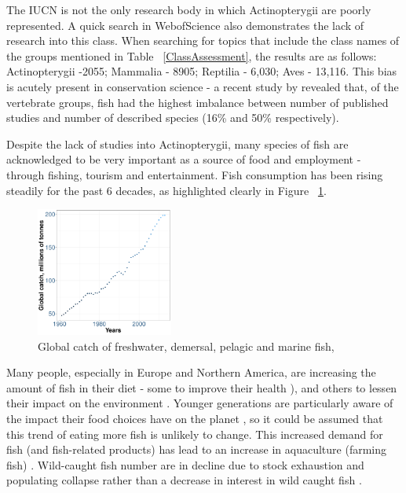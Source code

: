 \documentclass[11pt]{article}
\begin{document}
The IUCN is not the only research body in which Actinopterygii are poorly 
represented. A 
quick search in WebofScience also demonstrates the lack of research into this 
class. When searching for topics that include the class names of the groups 
mentioned in Table ~\ref{ClassAssessment}, the results are as follows: 
Actinopterygii -2055; Mammalia - 8905; Reptilia - 6,030; Aves - 13,116.  This 
bias is acutely present in conservation science - a recent study by 
\cite{Watson2017} revealed that, of the vertebrate groups, fish had the highest 
imbalance between number of published studies and number of described species 
(16\% and 50\% respectively).

Despite the lack of studies into Actinopterygii, many species of fish are 
acknowledged to be very important as a source of food and employment - through 
fishing, tourism and entertainment. Fish consumption 
has been rising steadily for the past 6 decades, as highlighted clearly in 
Figure ~\ref{GlobalCatch}. 

\begin{figure}
	
	\includegraphics[width=0.4\textwidth]{Images/GobalCatch.pdf}	
	\caption{Global catch of freshwater, demersal, pelagic and marine fish, \\
	\autocite{FAO2020} }  
	\label{GlobalCatch}
	
\end{figure}


Many people, especially in Europe and Northern 
America, are increasing the amount of fish in their diet - some to improve 
their health 
\autocite{Rimm2006}), and others to 
lessen their impact on the environment \autocite{Mary2020}. Younger generations 
are particularly aware of the impact their food choices have on the planet 
\autocite{Mary2020}, so it could be assumed that this trend of eating more fish 
is unlikely to change. This increased demand for fish (and fish-related 
products) has lead to an increase in aquaculture (farming fish) 
\autocite{Belton2018}. Wild-caught 
fish number are in decline due to stock exhaustion and 
populating collapse rather than a decrease in interest in wild caught fish 
\autocite{Tremblay2011, Belton2018}. 
\end{document}

